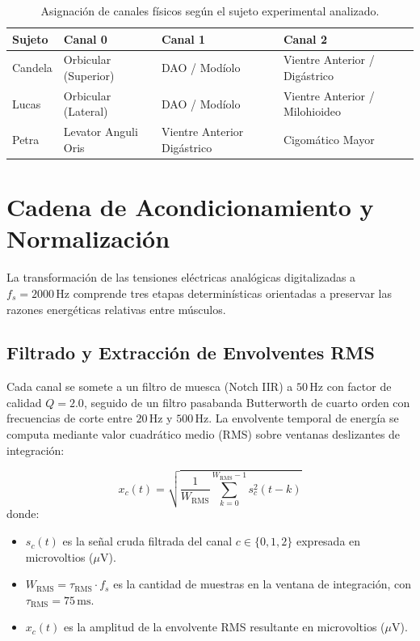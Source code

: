 \documentclass[11pt,a4paper,openany]{book}
\theoremstyle{definition}
\begin{document}
\begin{table}[H]
\centering
\small
\begin{tabularx}{\textwidth}{l p{3.5cm} p{3.5cm} X}
\toprule
\textbf{Sujeto} & \textbf{Canal 0} & \textbf{Canal 1} & \textbf{Canal 2} \\
\midrule
Candela & Orbicular (Superior) & DAO / Modíolo & Vientre Anterior / Digástrico \\
Lucas   & Orbicular (Lateral)  & DAO / Modíolo & Vientre Anterior / Milohioideo \\
Petra   & Levator Anguli Oris  & Vientre Anterior Digástrico & Cigomático Mayor \\
\bottomrule
\end{tabularx}
\caption{Asignación de canales físicos según el sujeto experimental analizado.}
\label{tab:canales_sujetos}
\end{table}

\section{Cadena de Acondicionamiento y Normalización}
\label{sec:acondicionamiento}

La transformación de las tensiones eléctricas analógicas digitalizadas a $f_s = 2000\,\text{Hz}$ comprende tres etapas determinísticas orientadas a preservar las razones energéticas relativas entre músculos.

\subsection{Filtrado y Extracción de Envolventes RMS}
\label{subsec:filtrado_rms}

Cada canal se somete a un filtro de muesca (Notch IIR) a $50\,\text{Hz}$ con factor de calidad $Q = 2.0$, seguido de un filtro pasabanda Butterworth de cuarto orden con frecuencias de corte entre $20\,\text{Hz}$ y $500\,\text{Hz}$. La envolvente temporal de energía se computa mediante valor cuadrático medio (RMS) sobre ventanas deslizantes de integración:

\begin{equation}
    x_c(t) = \sqrt{\frac{1}{W_{\text{RMS}}} \sum_{k=0}^{W_{\text{RMS}}-1} s_c^2(t - k)}
    \label{eq:rms_envolvente}
\end{equation}
donde:
\begin{itemize}
    \item $s_c(t)$ es la señal cruda filtrada del canal $c \in \{0, 1, 2\}$ expresada en microvoltios ($\mu\text{V}$).
    \item $W_{\text{RMS}} = \tau_{\text{RMS}} \cdot f_s$ es la cantidad de muestras en la ventana de integración, con $\tau_{\text{RMS}} = 75\,\text{ms}$.
    \item $x_c(t)$ es la amplitud de la envolvente RMS resultante en microvoltios ($\mu\text{V}$).
\end{itemize}
\end{document}
